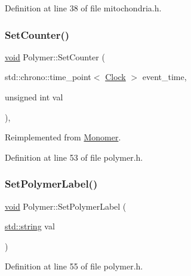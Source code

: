 Definition at line 38 of file mitochondria.\+h.

\mbox{\label{class_polymer_a1500ffc682396af2f4306c7c7ea7fd87}} 
\subsubsection{\texorpdfstring{Set\+Counter()}{SetCounter()}}
{\footnotesize\ttfamily \mbox{\hyperlink{glad_8h_a950fc91edb4504f62f1c577bf4727c29}{void}} Polymer\+::\+Set\+Counter (\begin{DoxyParamCaption}\item[{std\+::chrono\+::time\+\_\+point$<$ \mbox{\hyperlink{universe_8h_a0ef8d951d1ca5ab3cfaf7ab4c7a6fd80}{Clock}} $>$}]{event\+\_\+time,  }\item[{unsigned int}]{val }\end{DoxyParamCaption})\hspace{0.3cm}{\ttfamily [inline]}, {\ttfamily [virtual]}}



Reimplemented from \mbox{\hyperlink{class_monomer_a6f0dfa4382b3d4fa19b7ee0fb8fe7a55}{Monomer}}.



Definition at line 53 of file polymer.\+h.

\mbox{\label{class_polymer_ab96200f701d9e2e63d22bdfd434e5ccb}} 
\subsubsection{\texorpdfstring{Set\+Polymer\+Label()}{SetPolymerLabel()}}
{\footnotesize\ttfamily \mbox{\hyperlink{glad_8h_a950fc91edb4504f62f1c577bf4727c29}{void}} Polymer\+::\+Set\+Polymer\+Label (\begin{DoxyParamCaption}\item[{\mbox{\hyperlink{glad_8h_ae84541b4f3d8e1ea24ec0f466a8c568b}{std\+::string}}}]{val }\end{DoxyParamCaption})\hspace{0.3cm}{\ttfamily [inline]}}



Definition at line 55 of file polymer.\+h.

